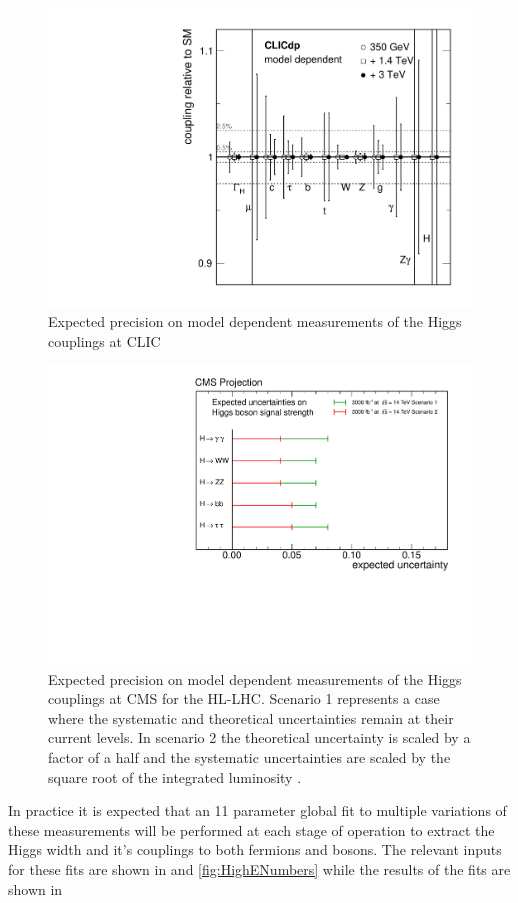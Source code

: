 \begin{figure}
\centering
\includegraphics[width=0.45\linewidth]{Theory/fig/FitResultsMD.pdf}
\caption[Expected precision on model dependent measurements of the Higgs couplings at CLIC]{Expected precision on model dependent measurements of the Higgs couplings at CLIC \cite{Abramowicz:2016zbo}}
\label{fig:modelDependentCouplings}
\end{figure}

\begin{figure}
\centering
\includegraphics[width=0.5\linewidth]{Theory/fig/MuSnowmass3000.pdf}
\caption[Expected precision on model dependent measurements of the Higgs couplings at CMS]{Expected precision on model dependent measurements of the Higgs couplings at \ac{CMS} for the \ac{HL-LHC}. Scenario 1 represents a case where the systematic and theoretical uncertainties remain at their current levels. In scenario 2 the theoretical uncertainty is scaled by a factor of a half and the systematic uncertainties are scaled by the square root of the integrated luminosity \cite{CMS:2013xfa}.}
\label{fig:CMSHiggsPredictions}
\end{figure}

In practice it is expected that an 11 parameter global fit to multiple variations of these measurements will be performed at each stage of operation to extract the Higgs width and it's couplings to both fermions and bosons. The relevant inputs for these fits are shown in  and \ref{fig:HighENumbers} while the results of the fits are shown in 

